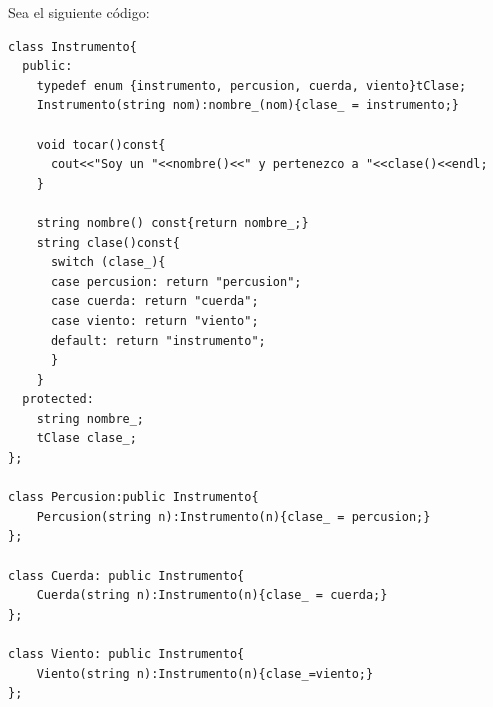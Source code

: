 \newpage
{} Sea el siguiente código:
\begin{center}
  \begin{lstlisting}[frame = single]
class Instrumento{
  public:
    typedef enum {instrumento, percusion, cuerda, viento}tClase;
    Instrumento(string nom):nombre_(nom){clase_ = instrumento;}

    void tocar()const{
      cout<<"Soy un "<<nombre()<<" y pertenezco a "<<clase()<<endl;
    }

    string nombre() const{return nombre_;}
    string clase()const{
      switch (clase_){
      case percusion: return "percusion";
      case cuerda: return "cuerda";
      case viento: return "viento";
      default: return "instrumento";
      }
    }
  protected:
    string nombre_;
    tClase clase_;
};

class Percusion:public Instrumento{
    Percusion(string n):Instrumento(n){clase_ = percusion;}
};  

class Cuerda: public Instrumento{
    Cuerda(string n):Instrumento(n){clase_ = cuerda;}
};

class Viento: public Instrumento{
    Viento(string n):Instrumento(n){clase_=viento;}
};
  \end{lstlisting}
\end{center}

